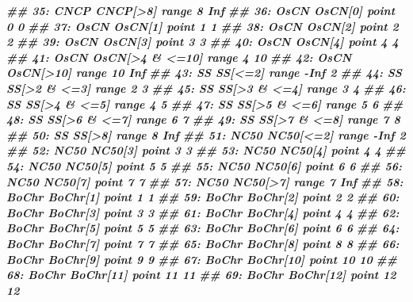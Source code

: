 \documentclass[
  12pt,
  a4paper,
  twoside]{book}
\newenvironment{Shaded}{\begin{snugshade}}{\end{snugshade}}
\newcommand{\DocumentationTok}[1]{\textcolor[rgb]{0.56,0.35,0.01}{\textbf{\textit{#1}}}}
\begin{document}
\begin{Shaded}
\begin{Highlighting}[]
\DocumentationTok{\#\# 35:    CNCP          CNCP[\textgreater{}8] range    8 Inf}
\DocumentationTok{\#\# 36:    OsCN           OsCN[0] point    0   0}
\DocumentationTok{\#\# 37:    OsCN           OsCN[1] point    1   1}
\DocumentationTok{\#\# 38:    OsCN           OsCN[2] point    2   2}
\DocumentationTok{\#\# 39:    OsCN           OsCN[3] point    3   3}
\DocumentationTok{\#\# 40:    OsCN           OsCN[4] point    4   4}
\DocumentationTok{\#\# 41:    OsCN   OsCN[\textgreater{}4 \& \textless{}=10] range    4  10}
\DocumentationTok{\#\# 42:    OsCN         OsCN[\textgreater{}10] range   10 Inf}
\DocumentationTok{\#\# 43:      SS           SS[\textless{}=2] range {-}Inf   2}
\DocumentationTok{\#\# 44:      SS      SS[\textgreater{}2 \& \textless{}=3] range    2   3}
\DocumentationTok{\#\# 45:      SS      SS[\textgreater{}3 \& \textless{}=4] range    3   4}
\DocumentationTok{\#\# 46:      SS      SS[\textgreater{}4 \& \textless{}=5] range    4   5}
\DocumentationTok{\#\# 47:      SS      SS[\textgreater{}5 \& \textless{}=6] range    5   6}
\DocumentationTok{\#\# 48:      SS      SS[\textgreater{}6 \& \textless{}=7] range    6   7}
\DocumentationTok{\#\# 49:      SS      SS[\textgreater{}7 \& \textless{}=8] range    7   8}
\DocumentationTok{\#\# 50:      SS            SS[\textgreater{}8] range    8 Inf}
\DocumentationTok{\#\# 51:    NC50         NC50[\textless{}=2] range {-}Inf   2}
\DocumentationTok{\#\# 52:    NC50           NC50[3] point    3   3}
\DocumentationTok{\#\# 53:    NC50           NC50[4] point    4   4}
\DocumentationTok{\#\# 54:    NC50           NC50[5] point    5   5}
\DocumentationTok{\#\# 55:    NC50           NC50[6] point    6   6}
\DocumentationTok{\#\# 56:    NC50           NC50[7] point    7   7}
\DocumentationTok{\#\# 57:    NC50          NC50[\textgreater{}7] range    7 Inf}
\DocumentationTok{\#\# 58:   BoChr          BoChr[1] point    1   1}
\DocumentationTok{\#\# 59:   BoChr          BoChr[2] point    2   2}
\DocumentationTok{\#\# 60:   BoChr          BoChr[3] point    3   3}
\DocumentationTok{\#\# 61:   BoChr          BoChr[4] point    4   4}
\DocumentationTok{\#\# 62:   BoChr          BoChr[5] point    5   5}
\DocumentationTok{\#\# 63:   BoChr          BoChr[6] point    6   6}
\DocumentationTok{\#\# 64:   BoChr          BoChr[7] point    7   7}
\DocumentationTok{\#\# 65:   BoChr          BoChr[8] point    8   8}
\DocumentationTok{\#\# 66:   BoChr          BoChr[9] point    9   9}
\DocumentationTok{\#\# 67:   BoChr         BoChr[10] point   10  10}
\DocumentationTok{\#\# 68:   BoChr         BoChr[11] point   11  11}
\DocumentationTok{\#\# 69:   BoChr         BoChr[12] point   12  12}

\end{Highlighting}
\end{Shaded}
\end{document}
